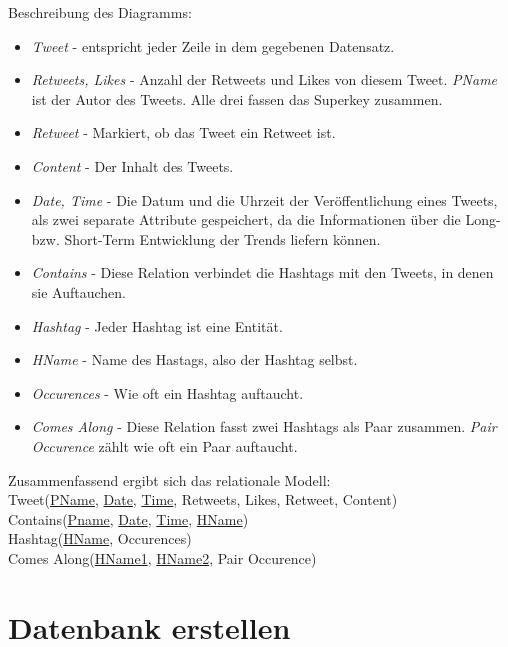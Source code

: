 \documentclass[paper=a4, english, ngerman, romanian]{scrartcl}
\begin{document}
	Beschreibung des Diagramms:
	
	\begin{itemize}
	\item \textit{Tweet} - entspricht jeder Zeile in dem gegebenen Datensatz.
	\item \textit{Retweets, Likes} - Anzahl der Retweets und Likes von diesem Tweet. \textit{PName} ist der Autor des Tweets. Alle drei fassen das Superkey zusammen.
	\item \textit{Retweet} - Markiert, ob das Tweet ein Retweet ist.
	\item \textit{Content} - Der Inhalt des Tweets.
	\item \textit{Date, Time} - Die Datum und die Uhrzeit der Veröffentlichung eines Tweets, als zwei separate Attribute gespeichert, da die Informationen über die Long- bzw. Short-Term Entwicklung der Trends liefern können.
	\item \textit{Contains} - Diese Relation verbindet die Hashtags mit den Tweets, in denen sie Auftauchen.
	\item \textit{Hashtag} - Jeder Hashtag ist eine Entität.
	\item \textit{HName} - Name des Hastags, also der Hashtag selbst.
	\item \textit{Occurences} - Wie oft ein Hashtag auftaucht.
	\item \textit{Comes Along} - Diese Relation fasst zwei Hashtags als Paar zusammen. \textit{Pair Occurence} zählt wie oft ein Paar auftaucht.
	\end{itemize}

	Zusammenfassend ergibt sich das relationale Modell: \\

	Tweet(\underline{PName}, \underline{Date}, \underline{Time}, Retweets, Likes, Retweet, Content)\\
	Contains(\underline{Pname}, \underline{Date}, \underline{Time}, \underline{HName})\\
	Hashtag(\underline{HName}, Occurences)\\
	Comes Along(\underline{HName1}, \underline{HName2}, Pair Occurence)   
	
	\section{Datenbank erstellen}
	
\end{document}
